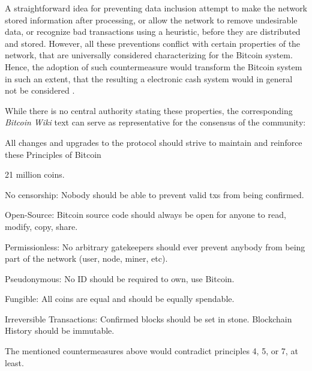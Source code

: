 \documentclass[a4paper,11pt,titlepage]{scrbook}
\begin{document}
A straightforward idea for preventing data inclusion attempt to make the network  stored information after processing, or allow the network to remove undesirable data, or recognize bad transactions using a heuristic, before they are distributed and stored.
However, all these preventions conflict with certain properties of the network, that are universally considered characterizing for the Bitcoin system.
Hence, the adoption of such countermeasure would transform the Bitcoin system in such an extent, that the resulting a electronic cash system would in general not be considered .

While there is no central authority stating these properties, the corresponding \emph{Bitcoin Wiki} text can serve as representative for the consensus of the community:
\begin{displayquote}
    \noindent
    All changes and upgrades to the protocol should strive to maintain and reinforce these Principles of Bitcoin

    \begin{enumerate}[label={[}\arabic*.{]}]
        \item 21 million coins.
        \item No censorship: Nobody should be able to prevent valid txs from being confirmed.
        \item Open-Source: Bitcoin source code should always be open for anyone to read, modify, copy, share.
        \item Permissionless: No arbitrary gatekeepers should ever prevent anybody from being part of the network (user, node, miner, etc).
        \item Pseudonymous: No ID should be required to own, use Bitcoin.
        \item Fungible: All coins are equal and should be equally spendable.
        \item Irreversible Transactions: Confirmed blocks should be set in stone. Blockchain History should be immutable.
    \end{enumerate}
\end{displayquote}
The mentioned countermeasures above would contradict principles 4, 5, or 7, at least.
\end{document}
